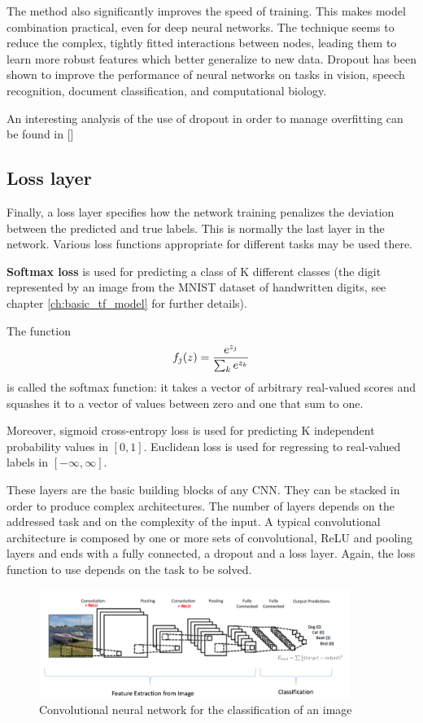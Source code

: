 The method also significantly improves the speed of training. This makes model combination practical, even for deep neural networks. The technique seems to reduce the complex, tightly fitted interactions between nodes, leading them to learn more robust features which better generalize to new data. Dropout has been shown to improve the performance of neural networks on tasks in vision, speech recognition, document classification, and computational biology.

An interesting analysis of the use of dropout in order to manage overfitting can be found in [\cite{Srivastava:2014:DSW:2627435.2670313}]

\subsection{Loss layer}

Finally, a loss layer specifies how the network training penalizes the deviation between the predicted and true labels. This is normally the last layer in the network. Various loss functions appropriate for different tasks may be used there. 

\textbf{Softmax loss} is used for predicting a class of K different classes (\ie the digit represented by an image from the MNIST dataset of handwritten digits, see chapter \ref{ch:basic_tf_model} for further details).

The function
\begin{equation} \notag
	f_j(z)=\frac{e^{z_j}}{\sum_{k}e^{z_k}}
\end{equation}
is called the softmax function: it takes a vector of arbitrary real-valued scores and squashes it to a vector of values between zero and one that sum to one.

Moreover, sigmoid cross-entropy loss is used for predicting K independent probability values in $[0,1]$. Euclidean loss is used for regressing to real-valued labels in $[-\infty ,\infty ]$.

\bigskip

These layers are the basic building blocks of any \acs{CNN}. They can be stacked in order to produce complex architectures. The number of layers depends on the addressed task and on the complexity of the input. A typical convolutional architecture is composed by one or more sets of convolutional, \acs{ReLU} and pooling layers and ends with a fully connected, a dropout and a loss layer. Again, the loss function to use depends on the task to be solved.

\begin{figure}
	\centering
	\includegraphics[width=0.9\textwidth]{Images/conv_architecture}
	\caption{Convolutional neural network for the classification of an image}\label{fig:conv_architecture}
\end{figure}

